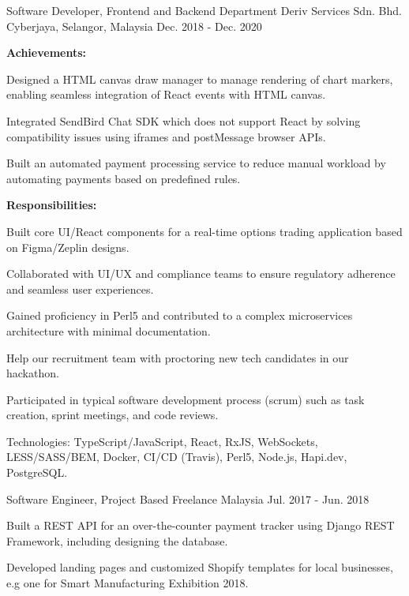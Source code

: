 \begin{cventries}
  \cventry
    {Software Developer, Frontend and Backend Department} %
    {Deriv Services Sdn. Bhd.} %
    {Cyberjaya, Selangor, Malaysia} %
    {Dec. 2018 - Dec. 2020} %
    {
      \textbf{Achievements:}
      \vspace{1.5em}
      \begin{cvitems} %
        \item {Designed a HTML canvas draw manager to manage rendering of chart markers, enabling seamless integration of React events with HTML canvas.}
        \item {Integrated SendBird Chat SDK which does not support React by solving compatibility issues using iframes and postMessage browser APIs.}
        \item {Built an automated payment processing service to reduce manual workload by automating payments based on predefined rules.}
      \end{cvitems}
      \vspace{1.5em}
      \textbf{Responsibilities:}
      \vspace{1.5em}
      \begin{cvitems} %
        \item {Built core UI/React components for a real-time options trading application based on Figma/Zeplin designs.}
        \item {Collaborated with UI/UX and compliance teams to ensure regulatory adherence and seamless user experiences.}
        \item {Gained proficiency in Perl5 and contributed to a complex microservices architecture with minimal documentation.}
        \item {Help our recruitment team with proctoring new tech candidates in our hackathon.}
        \item {Participated in typical software development process (scrum) such as task creation, sprint meetings, and code reviews.}
        \item {Technologies: TypeScript/JavaScript, React, RxJS, WebSockets, LESS/SASS/BEM, Docker, CI/CD (Travis), Perl5, Node.js, Hapi.dev, PostgreSQL.}
      \end{cvitems}
    }

  \cventry
    {Software Engineer, Project Based} %
    {Freelance} %
    {Malaysia} %
    {Jul. 2017 - Jun. 2018} %
    {
      \begin{cvitems} %
        \item {Built a REST API for an over-the-counter payment tracker using Django REST Framework, including designing the database.}
        \item {Developed landing pages and customized Shopify templates for local businesses, e.g one for Smart Manufacturing Exhibition 2018.}
      \end{cvitems}
    }

\end{cventries}
